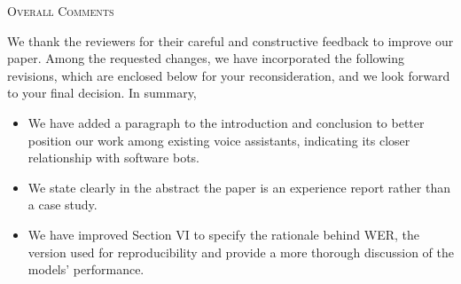 \documentclass[journal,12pt,onecolumn,draftclsnofoot,]{IEEEtran}
\begin{document}
%
%
%
%
%

\begin{center}{\textsc{Overall Comments}}\end{center}

We thank the reviewers for their careful and constructive feedback to improve our paper. Among the requested changes, we have incorporated the following revisions, which are enclosed below for your reconsideration, and we look forward to your final decision. In summary,

\begin{itemize}
\item We have added a paragraph to the introduction and conclusion to better position our work among existing voice assistants, indicating its closer relationship with software bots.
\item We state clearly in the abstract the paper is an experience report rather than a case study.
\item We have improved Section VI to specify the rationale behind WER, the version used for reproducibility and provide a more thorough discussion of the models' performance.
\end{itemize}
\end{document}
